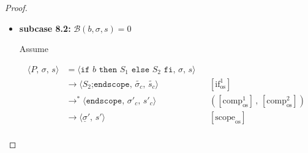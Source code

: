 \documentclass{article}
\begin{document}
\begin{proof}
\begin{itemize}
\begin{itemize}
\[\begin{aligned}
              && \text{(operational semantics)} \\
              &\triangleright^\ast \langle \texttt{PSCOPE} : \\
              &\quad \texttt{GOTO}\; pc_{\texttt{NOOP}} : \texttt{CSCOPE} : \mathcal{C}(S_2) : \\
              &\quad \texttt{PSCOPE} : \texttt{NOOP},\, e',\, \sigma'_c ,\, s'_c,\, pc + l_b + l_{S_1} + 2 \rangle
              && \text{(induction hypothesis)} \\
              &\triangleright \langle \texttt{GOTO}\; pc_{\texttt{NOOP}} : \texttt{CSCOPE} : \mathcal{C}(S_2) : \\
              &\quad \texttt{PSCOPE} : \texttt{NOOP},\, e',\, \underline{\sigma}' ,\, s',\, pc + l_b + l_{S_1} + 3 \rangle
              && \text{(induction hypothesis)} \\
              &\triangleright \langle \texttt{NOOP},\, e',\, \underline{\sigma}' ,\, s',\, pc_{\texttt{NOOP}} \rangle
              && \text{(operational semantics)} \\
              &\triangleright \langle \epsilon,\, e',\, \underline{\sigma}' ,\, s',\, pc_{\texttt{NOOP}} + 1 \rangle
              && \text{(operational semantics)} \\
              \end{aligned}
          \]

        
        \item \textbf{subcase 8.2:} $\mathcal{B}(b, \sigma, s) = 0$

            Assume

                \[
                  \begin{aligned}
                  \langle P,\, \sigma,\, s \rangle
                  &=\langle \texttt{if } b \texttt{ then } S_1 \texttt{ else } S_2 \texttt{ fi},\, \sigma,\, s \rangle \\
                  &\rightarrow \langle S_2\texttt{;endscope},\, \tilde{\sigma_c} ,\, \tilde{s_c} \rangle
                  && [\text{if}^1_{\text{os}}]   \\
                  &\rightarrow^\ast \langle \texttt{endscope},\, \sigma'_c ,\, s'_c \rangle 
                  && ([\text{comp}^1_{\text{os}}] \,,\, [\text{comp}^2_{\text{os}}])   \\
                  &\rightarrow \langle \underline{\sigma}' ,\, s' \rangle
                  && [\text{scope}_{\text{os}}]   \\
                  \end{aligned}
              \]


\end{itemize}
\end{itemize}
\end{proof}
\end{document}
